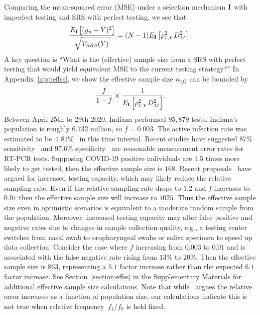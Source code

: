 \documentclass[11pt]{amsart}
\numberwithin{equation}{section}
\theoremstyle{plain}
\def\I{\bf I}
\begin{document}
 Comparing the mean-squared error (MSE) under a selection mechanism $\I$ with imperfect testing and SRS with perfect testing, we see that
 $$
 \frac{E_{\I} \left[ (\bar y_n - \bar Y)^2 \right]}{\sqrt{V_{SRS} (\bar Y)}} = (N-1) E_{\I} \left[ \rho_{I,Y}^2 D_M^2 \right].
 $$
 A key question is ``What is the (effective) sample size from a SRS with perfect testing that would yield equivalent MSE to the current testing strategy?'' In Appendix~\ref{app:effss}, we show the effective sample size $n_{eff}$ can be bounded by
 $$
 \frac{f}{1-f} \times \frac{1}{E_{\I} \left[ \rho_{I,Y}^2 D_M^2 \right]}.
 $$
 Between April 25th to 29th 2020, Indiana performed $95,879$ tests.  Indiana's population is roughly $6.732$ million, so $f = 0.003$.  The active infection rate was estimated to be~$1.81\%$~\citep{Yiannoutsos2021} in this time interval. Recent studies have suggested 87\% sensitivity~\citep{Arevalo2020} and 97.6\% specificity~\citep{Cohen2020} are reasonable measurement error rates for RT-PCR tests. Supposing COVID-19 positive individuals are $1.5$ times more likely to get tested, then the effective sample size is $168$. Recent proposals~\citep{Siddarth2020} have argued for increased testing capacity, which may likely reduce the relative sampling rate.  Even if the relative sampling rate drops to $1.2$ and $f$ increases to $0.01$ then the effective sample size will increase to $1025$.  Thus the effective sample size even in optimistic scenarios is equivalent to a moderate random sample from the population.  Moreover, increased testing capacity may alter false positive and negative rates due to changes in sample collection quality, e.g., a testing center switches from nasal swab to oropharyngeal swabs or saliva specimen to speed up data collection.  Consider the case where $f$ increasing from $0.003$ to $0.01$ and is associated with the false negative rate rising from $13\%$ to $20$\%.  Then the effective sample size is $863$, representing a $5.1$ factor increase rather than the expected $6.1$ factor increase. See Section~\ref{section:effss} in the Supplementary Materials for additional effective sample size calculations.  Note that while~\citep{Meng2018} argues the relative error increases as a function of population size, our calculations indicate this is not true when relative frequency~$f_1/f_0$ is held fixed.
\end{document}
